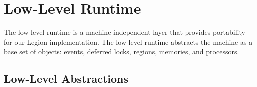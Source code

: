 \section{Low-Level Runtime}
\label{sec:lowlevel}

The low-level runtime is a machine-independent layer that provides portability
for our Legion implementation.
The low-level runtime abstracts the machine as a base set of objects:
events, deferred locks, regions, memories, and processors.






\subsection{Low-Level Abstractions}
\label{subsec:lowobjects}
